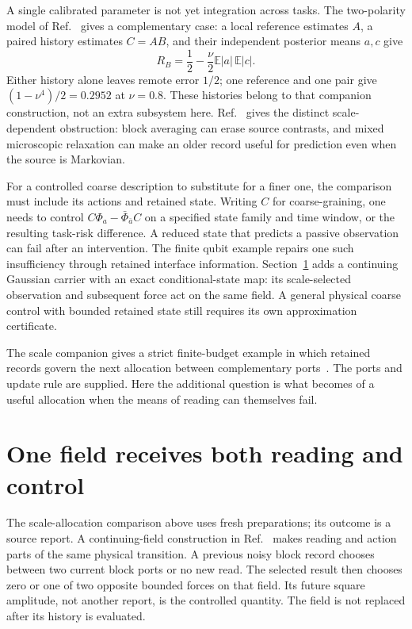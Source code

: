 \documentclass[11pt,a4paper]{article}
\newcommand{\E}{\mathbb E}
\begin{document}
A single calibrated parameter is not yet integration across tasks. The two-polarity model of Ref.~\cite{StableHulls} gives a complementary case: a local reference estimates $A$, a paired history estimates $C=AB$, and their independent posterior means $a,c$ give
\begin{equation}\label{eq:integration}
 R_B=\frac12-\frac\nu2\E|a|\,\E|c|.
\end{equation}
Either history alone leaves remote error $1/2$; one reference and one pair give $(1-\nu^4)/2=0.2952$ at $\nu=0.8$. These histories belong to that companion construction, not an extra subsystem here. Ref.~\cite{ImprintRG} gives the distinct scale-dependent obstruction: block averaging can erase source contrasts, and mixed microscopic relaxation can make an older record useful for prediction even when the source is Markovian.

For a controlled coarse description to substitute for a finer one, the comparison must include its actions and retained state. Writing $C$ for coarse-graining, one needs to control $C\Phi_a-\bar\Phi_{\bar a}C$ on a specified state family and time window, or the resulting task-risk difference. A reduced state that predicts a passive observation can fail after an intervention. The finite qubit example repairs one such insufficiency through retained interface information. Section~\ref{sec:field-return} adds a continuing Gaussian carrier with an exact conditional-state map: its scale-selected observation and subsequent force act on the same field. A general physical coarse control with bounded retained state still requires its own approximation certificate.

The scale companion gives a strict finite-budget example in which
retained records govern the next allocation between complementary
ports~\cite{ImprintRG}. The ports and update rule are supplied.
Here the additional question is what becomes of a useful allocation
when the means of reading can themselves fail.

\section{One field receives both reading and control}
\label{sec:field-return}

The scale-allocation comparison above uses fresh preparations; its
outcome is a source report. A continuing-field construction in
Ref.~\cite{ImprintRG} makes reading and action parts of the same
physical transition. A previous noisy block record chooses between
two current block ports or no new read. The selected result then
chooses zero or one of two opposite bounded forces on that field.
Its future square amplitude, not another report, is the controlled
quantity. The field is not replaced after its history is evaluated.
\end{document}
